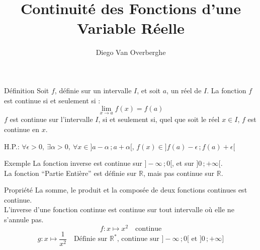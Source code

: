 \documentclass{cours}
\title{Continuité des Fonctions d'une \\ Variable Réelle}
\author{Diego Van Overberghe}
\begin{document}

    \begin{Gpartie}{Définition}
        Soit $f$, définie sur un intervalle $I$, et soit $a$, un réel de $I$.
        La fonction $f$ est continue si et seulement si : \[\lim_{x \to a} f(x)=f(a)\]
        $f$ est continue sur l'intervalle $I$, si et seulement si, quel que soit le réel $x\in I$, $f$ est continue en $x$.

        H.P.: $\forall\epsilon >0,\ \exists\alpha >0,\ \forall x\in\big]a-\alpha\,; a+\alpha\big[,\, f(x)\in\big]f(a)-\epsilon\,; f(a)+\epsilon\big[$
        \begin{Spartie}{Exemple}
            La fonction inverse est continue sur $\big]-\infty\,;0\big[$, et sur $\big]0\,;+\infty\big[$.\\
            La fonction ``Partie Entière'' est définie sur $\mathbb{R}$, mais pas continue sur $\mathbb{R}$. \\[2ex]
            \begin{center}\end{center}
            \parbox{\linewidth}{\captionof{figure}{\centering Représentation Graphique de la Fonction \linebreak ``Partie Entière'', continue sur $\big[n\,;n+1\big[$ avec $n\in\mathbb{Z}$.}}
            \begin{center}\end{center}
            \parbox{\linewidth}{}
        \end{Spartie}

        \begin{Spartie}{Propriété}
            La somme, le produit et la composée de deux fonctions continues est continue. \\
            L'inverse d'une fonction continue est continue sur tout intervalle où elle ne s'annule pas.
            \[f : x\mapsto x^2\quad\text{continue}\] \[g : x\mapsto\dfrac{1}{x^2}\quad\text{Définie sur }\mathbb{R}^*\text{, continue sur }\big]-\infty\,;0\big[\text{ et }\big]0\,;+\infty\big]\]
        \end{Spartie}
    \end{Gpartie}
\end{document}
